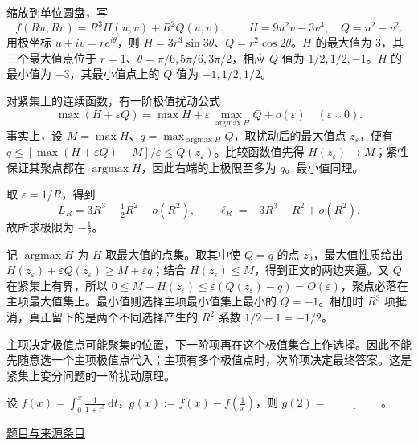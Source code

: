 \documentclass[12pt,fontset=fandol]{ctexart}
\begin{document}
\begin{solve}\label{ans:fin17-high:2}

缩放到单位圆盘，写
\[
f(Ru,Rv)=R^3H(u,v)+R^2Q(u,v),\qquad
H=9u^2v-3v^3,\quad Q=u^2-v^2.
\]
用极坐标 $u+iv=re^{i\theta}$，则 $H=3r^3\sin3\theta$、$Q=r^2\cos2\theta$。$H$ 的最大值为 $3$，其三个最大值点位于 $r=1$、$\theta=\pi/6,5\pi/6,3\pi/2$，相应 $Q$ 值为 $1/2,1/2,-1$。$H$ 的最小值为 $-3$，其最小值点上的 $Q$ 值为 $-1,1/2,1/2$。

对紧集上的连续函数，有一阶极值扰动公式
\[
\max(H+\varepsilon Q)=\max H+\varepsilon\max_{\operatorname{argmax}H}Q+o(\varepsilon)
\quad(\varepsilon\downarrow0).
\]
事实上，设 $M=\max H$、$q=\max_{\operatorname{argmax}H}Q$，取扰动后的最大值点 $z_\varepsilon$，便有 $q\le[\max(H+\varepsilon Q)-M]/\varepsilon\le Q(z_\varepsilon)$。比较函数值先得 $H(z_\varepsilon)\to M$；紧性保证其聚点都在 $\operatorname{argmax}H$，因此右端的上极限至多为 $q$。最小值同理。

取 $\varepsilon=1/R$，得到
\[
L_R=3R^3+\tfrac12R^2+o(R^2),\qquad
\ell_R=-3R^3-R^2+o(R^2).
\]
故所求极限为 $\boxed{-\tfrac12}$。

记 $\operatorname{argmax}H$ 为 $H$ 取最大值的点集。取其中使 $Q=q$ 的点 $z_0$，最大值性质给出 $H(z_\varepsilon)+\varepsilon Q(z_\varepsilon)\ge M+\varepsilon q$；结合 $H(z_\varepsilon)\le M$，得到正文的两边夹逼。又 $Q$ 在紧集上有界，所以 $0\le M-H(z_\varepsilon)\le\varepsilon(Q(z_\varepsilon)-q)=O(\varepsilon)$，聚点必落在主项最大值集上。最小值则选择主项最小值集上最小的 $Q=-1$。相加时 $R^3$ 项抵消，真正留下的是两个不同选择产生的 $R^2$ 系数 $1/2-1=-1/2$。

\end{solve}

\begin{remark}[方法与条件]主项决定极值点可能聚集的位置，下一阶项再在这个极值集合上作选择。因此不能先随意选一个主项极值点代入；主项有多个极值点时，次阶项决定最终答案。这是紧集上变分问题的一阶扰动原理。\end{remark}

\begin{example}[来源序号3]\label{ex:fin17-high:3}\label{pr:fin17-high:3}

设 $f(x)=\int_0^x\frac{1}{1+t^3}\,\mathrm{d}t$，$g(x):=f(x)-f\left(\frac{1}{x}\right)$，则 $g(2)=\underline{\hspace{2cm}}$。

\par\href{https://github.com/lzxcr/cmc-mathematics/blob/64916fa1fdbc3e444a652eca204d5669058ee321/src/problems/finals/17/03.md}{题目与来源条目}

\end{example}
\end{document}
